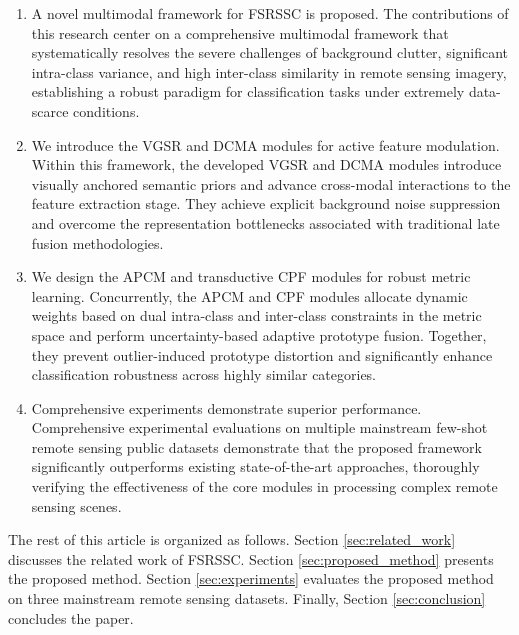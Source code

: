 \documentclass[lettersize,journal]{IEEEtran}
\begin{document}
\begin{enumerate}
    \item A novel multimodal framework for FSRSSC is proposed. 
    The contributions of this research center on a comprehensive multimodal framework that systematically resolves the severe challenges of background clutter, significant intra-class variance, and high inter-class similarity in remote sensing imagery, establishing a robust paradigm for classification tasks under extremely data-scarce conditions.
    
    \item We introduce the VGSR and DCMA modules for active feature modulation.
    Within this framework, the developed VGSR and DCMA modules introduce visually anchored semantic priors and advance cross-modal interactions to the feature extraction stage. 
    They achieve explicit background noise suppression and overcome the representation bottlenecks associated with traditional late fusion methodologies.
    
    \item We design the APCM and transductive CPF modules for robust metric learning. 
    Concurrently, the APCM and CPF modules allocate dynamic weights based on dual intra-class and inter-class constraints in the metric space and perform uncertainty-based adaptive prototype fusion. 
    Together, they prevent outlier-induced prototype distortion and significantly enhance classification robustness across highly similar categories.
    
    \item Comprehensive experiments demonstrate superior performance. 
    Comprehensive experimental evaluations on multiple mainstream few-shot remote sensing public datasets demonstrate that the proposed framework significantly outperforms existing state-of-the-art approaches, thoroughly verifying the effectiveness of the core modules in processing complex remote sensing scenes.
\end{enumerate}

The rest of this article is organized as follows. Section \ref{sec:related_work} discusses the related work of FSRSSC. Section \ref{sec:proposed_method} presents the proposed method. Section \ref{sec:experiments} evaluates the proposed method on three mainstream remote sensing datasets. Finally, Section \ref{sec:conclusion} concludes the paper.
\end{document}
